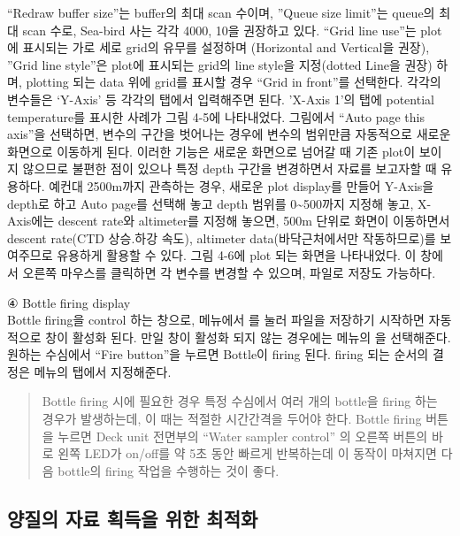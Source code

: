 \documentclass[
]{book}
\begin{document}
``Redraw buffer size''는 buffer의 최대 scan 수이며, ''Queue size limit''는 queue의 최대 scan 수로, Sea-bird 사는 각각 4000, 10을 권장하고 있다.
``Grid line use''는 plot에 표시되는 가로 세로 grid의 유무를 설정하며 (Horizontal and Vertical을 권장), ''Grid line style''은 plot에 표시되는 grid의 line style을 지정(dotted Line을 권장) 하며, plotting 되는 data 위에 grid를 표시할 경우 ``Grid in front''를 선택한다.
각각의 변수들은 `Y-Axis' 등 각각의 탭에서 입력해주면 된다. 'X-Axis 1'의 탭에 potential temperature를 표시한 사례가 그림 4-5에 나타내었다. 그림에서 ``Auto page this axis''을 선택하면, 변수의 구간을 벗어나는 경우에 변수의 범위만큼 자동적으로 새로운 화면으로 이동하게 된다. 이러한 기능은 새로운 화면으로 넘어갈 때 기존 plot이 보이지 않으므로 불편한 점이 있으나 특정 depth 구간을 변경하면서 자료를 보고자할 때 유용하다. 예컨대 2500m까지 관측하는 경우, 새로운 plot display를 만들어 Y-Axis을 depth로 하고 Auto page를 선택해 놓고 depth 범위를 0\textasciitilde500까지 지정해 놓고, X-Axis에는 descent rate와 altimeter를 지정해 놓으면, 500m 단위로 화면이 이동하면서 descent rate(CTD 상승.하강 속도), altimeter data(바닥근처에서만 작동하므로)를 보여주므로 유용하게 활용할 수 있다. 그림 4-6에 plot 되는 화면을 나타내었다. 이 창에서 오른쪽 마우스를 클릭하면 각 변수를 변경할 수 있으며, 파일로 저장도 가능하다.

④ Bottle firing display\\
Bottle firing을 control 하는 창으로, 메뉴에서 를 눌러 파일을 저장하기 시작하면 자동적으로 창이 활성화 된다. 만일 창이 활성화 되지 않는 경우에는 메뉴의 을 선택해준다. 원하는 수심에서 ``Fire button''을 누르면 Bottle이 firing 된다. firing 되는 순서의 결정은 메뉴의 탭에서 지정해준다.

\begin{quote}
Bottle firing 시에 필요한 경우 특정 수심에서 여러 개의 bottle을 firing 하는 경우가 발생하는데, 이 때는 적절한 시간간격을 두어야 한다. Bottle firing 버튼을 누르면 Deck unit 전면부의 ``Water sampler control'' 의 오른쪽 버튼의 바로 왼쪽 LED가 on/off를 약 5초 동안 빠르게 반복하는데 이 동작이 마쳐지면 다음 bottle의 firing 작업을 수행하는 것이 좋다.
\end{quote}

\hypertarget{uxc591uxc9c8uxc758-uxc790uxb8cc-uxd68duxb4dduxc744-uxc704uxd55c-uxcd5cuxc801uxd654}{%
\subsection{양질의 자료 획득을 위한 최적화}\label{uxc591uxc9c8uxc758-uxc790uxb8cc-uxd68duxb4dduxc744-uxc704uxd55c-uxcd5cuxc801uxd654}}
\end{document}
